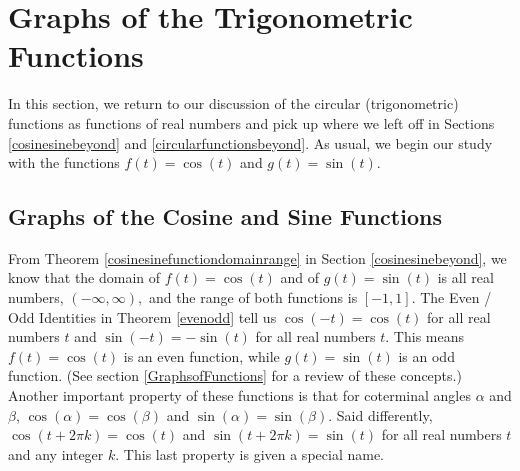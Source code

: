 \section{Graphs of the Trigonometric Functions}

\label{TrigGraphs}

In this section, we return to our discussion of the circular (trigonometric) functions as functions of real numbers and pick up where we left off in Sections \ref{cosinesinebeyond} and \ref{circularfunctionsbeyond}.  As usual, we begin our study with the functions $f(t) = \cos(t)$ and $g(t) = \sin(t)$.  

\subsection{Graphs of the Cosine and Sine Functions}

From Theorem \ref{cosinesinefunctiondomainrange} in Section \ref{cosinesinebeyond}, we know that the domain of $f(t) = \cos(t)$ and of $g(t) = \sin(t)$ is all real numbers, $(-\infty, \infty),$ and the range of both functions is $[-1,1]$.  The Even / Odd Identities in Theorem \ref{evenodd} tell us $\cos(-t) = \cos(t)$ for all real numbers $t$ and $\sin(-t) = -\sin(t)$ for all real numbers $t$.  This means $f(t) = \cos(t)$ is an even function, while $g(t) = \sin(t)$ is an odd function. (See section \ref{GraphsofFunctions} for a review of these concepts.)  Another important property of these  functions is that for coterminal angles $\alpha$ and $\beta$, $\cos(\alpha) = \cos(\beta)$ and $\sin(\alpha) = \sin(\beta)$.  Said differently,  $\cos(t + 2\pi k) = \cos(t)$ and $\sin(t + 2\pi k) = \sin(t)$ for all real numbers $t$ and any integer $k$.  This last property is given a special name.

\smallskip


\medskip

